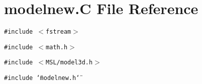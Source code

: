 \section{modelnew.C File Reference}
\label{modelnew_8C}
{\tt \#include $<$fstream$>$}\par
{\tt \#include $<$math.h$>$}\par
{\tt \#include $<$MSL/model3d.h$>$}\par
{\tt \#include \char`\"{}modelnew.h\char`\"{}}\par
